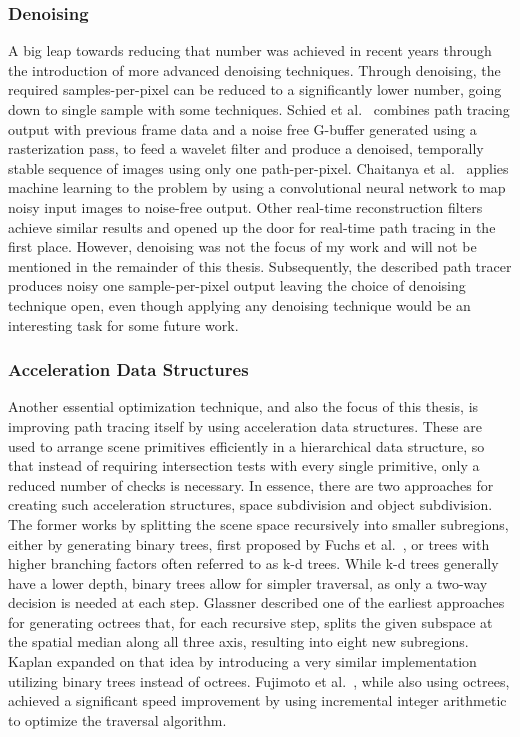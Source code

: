 \subsubsection{Denoising}
A big leap towards reducing that number was achieved in recent years through the introduction of more advanced denoising techniques. Through denoising, the required samples-per-pixel can be reduced to a significantly lower number, going down to single sample with some techniques. Schied et al.~\cite{schied_spatiotemporal_2017} combines path tracing output with previous frame data and a noise free G-buffer generated using a rasterization pass, to feed a wavelet filter and produce a denoised, temporally stable sequence of images using only one path-per-pixel. Chaitanya et al.~\cite{chaitanya_interactive_2017} applies machine learning to the problem by using a convolutional neural network to map noisy input images to noise-free output. Other real-time reconstruction filters\cite{mara17towards,koskela2019bmfr} achieve similar results and opened up the door for real-time path tracing in the first place. However, denoising was not the focus of my work and will not be mentioned in the remainder of this thesis. Subsequently, the described path tracer produces noisy one sample-per-pixel output leaving the choice of denoising technique open, even though applying any denoising technique would be an interesting task for some future work.
\subsubsection{Acceleration Data Structures}
Another essential optimization technique, and also the focus of this thesis, is improving path tracing itself by using acceleration data structures. These are used to arrange scene primitives efficiently in a hierarchical data structure, so that instead of requiring intersection tests with every single primitive, only a reduced number of checks is necessary. In essence, there are two approaches for creating such acceleration structures\cite{macDonald1988space}, space subdivision and object subdivision.
The former works by splitting the scene space recursively into smaller subregions, either by generating binary trees, first proposed by Fuchs et al.~\cite{fuchs1980bsp}, or trees with higher branching factors often referred to as k-d trees. While k-d trees generally have a lower depth, binary trees allow for simpler traversal, as only a two-way decision is needed at each step. 
Glassner\cite{glassner_space_1984} described one of the earliest approaches for generating octrees that, for each recursive step, splits the given subspace at the spatial median along all three axis, resulting into eight new subregions. Kaplan\cite{kaplan_use_1985} expanded on that idea by introducing a very similar implementation utilizing binary trees instead of octrees. Fujimoto et al.~\cite{fujimoto_arts_1986}, while also using octrees, achieved a significant speed improvement by using incremental integer arithmetic to optimize the traversal algorithm. 


